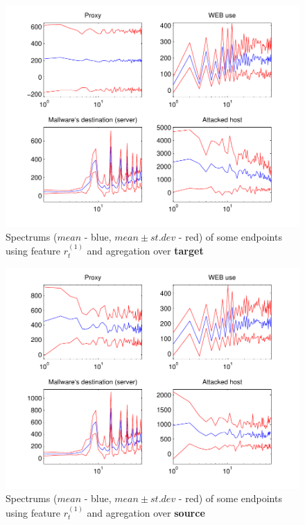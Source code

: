 \documentclass[a4paper,journal]{IEEEtran}
\begin{document}
\begin{figure}[h!]%
  \centering
  \includegraphics[width=140mm]{spect_dst_bdivp}
  \caption{Spectrums ($mean$ - blue, $mean\pm st.dev$ - red) of some  endpoints using feature $r_t^{(1)}$ and agregation over \textbf{target}}
  \label{fig:spect_dst_bdivp}
\end{figure}
\begin{figure}[h!]%
  \centering
  \includegraphics[width=140mm]{spect_src_bdivp}
  \caption{Spectrums ($mean$ - blue, $mean\pm st.dev$ - red) of some  endpoints using feature $r_t^{(1)}$ and agregation over \textbf{source}}
  \label{fig:spect_src_bdivp}
\end{figure}
\end{document}
